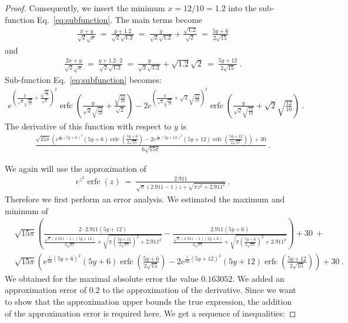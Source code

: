 \documentclass{article}
\DeclareMathOperator{\erfc}{erfc}
\begin{document}
\begin{proof}
Consequently, we insert the minimum $x=12/10=1.2$ into the  sub-function
Eq.~\eqref{eq:subfunction}. The main terms become
\begin{align}
\frac{x+y}{\sqrt{2} \sqrt{x}} \ = \ \frac{y+1.2}{\sqrt{2} \sqrt{1.2}} \ = \
\frac{y}{\sqrt{2} \sqrt{1.2}}+\frac{\sqrt{1.2}}{\sqrt{2}} \ = \
\frac{5 y+6}{2 \sqrt{15}} 
\end{align}
and
\begin{align}
\frac{2 x+y}{\sqrt{2} \sqrt{x}} \ = \ \frac{y+1.2 \cdot 2}{\sqrt{2} \sqrt{1.2}} \ = \
\frac{y}{\sqrt{2} \sqrt{1.2}}+\sqrt{1.2} \sqrt{2} \ = \
\frac{5 y+12}{2 \sqrt{15}} \ .
\end{align}
Sub-function
Eq.~\eqref{eq:subfunction} becomes:
\begin{align}
e^{\left(\frac{y}{\sqrt{2} \sqrt{\frac{12}{10}}}+\frac{\sqrt{\frac{12}{10}}}{\sqrt{2}}\right)^2} \erfc \left(\frac{y}{\sqrt{2} \sqrt{\frac{12}{10}}}+\frac{\sqrt{\frac{12}{10}}}{\sqrt{2}}\right)-2 e^{\left(\frac{y}{\sqrt{2} \sqrt{\frac{12}{10}}}+\sqrt{2} \sqrt{\frac{12}{10}}\right)^2} \erfc \left(\frac{y}{\sqrt{2} \sqrt{\frac{12}{10}}}+\sqrt{2} \sqrt{\frac{12}{10}}\right) \ .
\end{align}
The derivative of this function with respect to $y$ is
\begin{align}
\frac{\sqrt{15 \pi } \left(e^{\frac{1}{60} (5 y+6)^2} (5 y+6) \erfc \left(\frac{5 y+6}{2 \sqrt{15}}\right)-2 e^{\frac{1}{60} (5 y+12)^2} (5 y+12) \erfc \left(\frac{5 y+12}{2 \sqrt{15}}\right)\right)+30}{6 \sqrt{15 \pi }} \ .
\end{align}

We again will use the approximation of \citet{Ren:07}
\begin{align}
e^{z^2} \erfc (z) \ = \ \frac{2.911}{\sqrt{\pi } (2.911 -1)
  z+\sqrt{\pi  z^2+2.911^2}} \ .
\end{align}
Therefore we first perform an error analysis.
We estimated the maximum and minimum of 
\begin{align}
&\sqrt{15 \pi } \left(\frac{2 \cdot 2.911 (5 y+12)}{\frac{\sqrt{\pi } (2.911 -1) (5 y+12)}{2 \sqrt{15}}+\sqrt{\pi  \left(\frac{5 y+12}{2 \sqrt{15}}\right)^2+2.911^2}} - \frac{2.911 (5 y+6)}{\frac{\sqrt{\pi } (2.911 -1) (5 y+6)}{2 \sqrt{15}}+\sqrt{\pi  \left(\frac{5 y+6}{2 \sqrt{15}}\right)^2+2.911^2}} \right)+30\ + \\ \nonumber 
&\sqrt{15 \pi } \left(e^{\frac{1}{60} (5 y+6)^2} (5 y+6) \erfc \left(\frac{5 y+6}{2 \sqrt{15}}\right)-2 e^{\frac{1}{60} (5 y+12)^2} (5 y+12) \erfc \left(\frac{5 y+12}{2 \sqrt{15}}\right)\right)+30 \ .
\end{align}
We obtained for the maximal absolute error the value $0.163052$.
We added an approximation 
error of $0.2$ to the approximation of the derivative.
Since we want to show that the approximation upper bounds the true
expression, the addition of the approximation error is required here.
We get a sequence of inequalities:



\end{proof}
\end{document}
